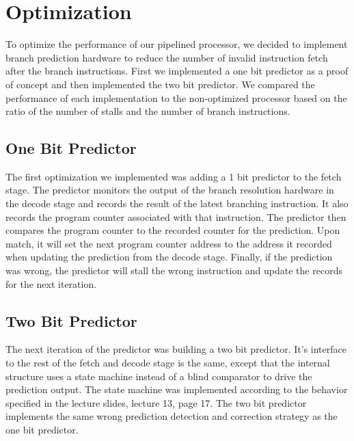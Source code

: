 \documentclass[12pt]{IEEEtran} %
\begin{document}


\section{Optimization} %
\label{sec:optimisation}
To optimize the performance of our pipelined processor, we decided to implement branch prediction hardware to reduce the number of invalid instruction fetch after the branch instructions. First we implemented a one bit predictor as a proof of concept and then implemented the two bit predictor. We compared the performance of each implementation to the non-optimized processor based on the ratio of the number of stalls and the number of branch instructions.

\subsection{One Bit Predictor} %
\label{sec:1_bit_predictor}
The first optimization we implemented was adding a 1 bit predictor to the fetch stage. The predictor monitors the output of the branch resolution hardware in the decode stage and records the result of the latest branching instruction. It also records the program counter associated with that instruction. The predictor then compares the program counter to the recorded counter for the prediction. Upon match, it will set the next program counter address to the address it recorded when updating the prediction from the decode stage. Finally, if the prediction was wrong, the predictor will stall the wrong instruction and update the records for the next iteration.  

\subsection{Two Bit Predictor} %
\label{sub:2_bit_predictor}
The next iteration of the predictor was building a two bit predictor. It's interface to the rest of the fetch and decode stage is the same, except that the internal structure uses a state machine instead of a blind comparator to drive the prediction output. The state machine was implemented according to the behavior specified in the lecture slides, lecture 13, page 17. The two bit predictor implements the same wrong prediction detection and correction strategy as the one bit predictor. 
\end{document}
